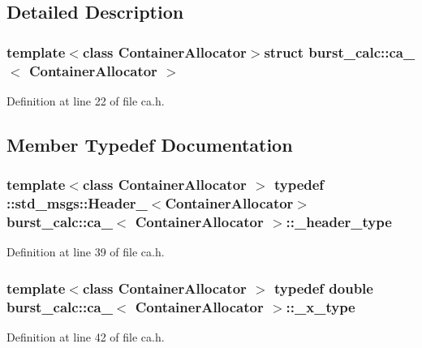 \subsection{\-Detailed \-Description}
\subsubsection*{template$<$class Container\-Allocator$>$struct burst\-\_\-calc\-::ca\-\_\-$<$ Container\-Allocator $>$}



\-Definition at line 22 of file ca.\-h.



\subsection{\-Member \-Typedef \-Documentation}
\subsubsection[{\-\_\-header\-\_\-type}]{\setlength{\rightskip}{0pt plus 5cm}template$<$class Container\-Allocator $>$ typedef \-::std\-\_\-msgs\-::\-Header\-\_\-$<$\-Container\-Allocator$>$ {\bf burst\-\_\-calc\-::ca\-\_\-}$<$ \-Container\-Allocator $>$\-::{\bf \-\_\-header\-\_\-type}}\label{structburst__calc_1_1ca___a5b5815505bb3df1f0a3f560ea0a3c55b}


\-Definition at line 39 of file ca.\-h.

\subsubsection[{\-\_\-x\-\_\-type}]{\setlength{\rightskip}{0pt plus 5cm}template$<$class Container\-Allocator $>$ typedef double {\bf burst\-\_\-calc\-::ca\-\_\-}$<$ \-Container\-Allocator $>$\-::{\bf \-\_\-x\-\_\-type}}\label{structburst__calc_1_1ca___afc22a80fa2b2aa6ed505c2287a1a94f7}


\-Definition at line 42 of file ca.\-h.


